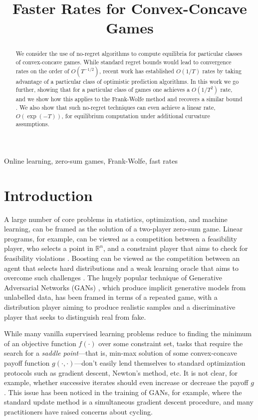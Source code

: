 \documentclass[pmlr]{jmlr} %
\title[Faster Rates for Convex-Concave Games]{Faster Rates for Convex-Concave Games}
\def\reals{\mathbb{R}}
\def\reals{\mathbb{R}}
\begin{document}
\maketitle
\begin{abstract}
We consider the use of no-regret algorithms to compute equilibria for particular classes of convex-concave games. While standard regret bounds would lead to convergence rates on the order of $O(T^{-1/2})$, recent work \citep{RS13,SALS15} has established $O(1/T)$ rates by taking advantage of a particular class of optimistic prediction algorithms. In this work we go further, showing that for a particular class of games one achieves a $O(1/T^{2})$ rate, and we show how this applies to the Frank-Wolfe method and recovers a similar bound \citep{D15}. We also show that such no-regret techniques can even achieve a linear rate, $O(\exp(-T))$, for equilibrium computation under additional curvature assumptions.
\end{abstract}

\begin{keywords}
Online learning, zero-sum games, Frank-Wolfe, fast rates
\end{keywords}

\section{Introduction}

A large number of core problems in statistics, optimization, and machine learning, can be framed as the solution of a two-player zero-sum game. Linear programs, for example, can be viewed as a competition between a feasibility player, who selects a point in $\reals^{n}$, and a constraint player that aims to check for feasibility violations \citep{Adler2013}. Boosting \citep{freund1999adaptive} can be viewed as the competition between an agent that selects hard distributions and a weak learning oracle that aims to overcome such challenges \citep{freund1996game}. The hugely popular technique of Generative Adversarial Networks (GANs) \citep{goodfellow2014generative}, which produce implicit generative models from unlabelled data, has been framed in terms of a repeated game, with a distribution player aiming to produce realistic samples and a discriminative player that seeks to distinguish real from fake. 

While many vanilla supervised learning problems reduce to finding the minimum of an objective function $f(\cdot)$ over some constraint set, tasks that require the search for a \emph{saddle point}---that is, min-max solution of some convex-concave payoff function $g(\cdot,\cdot)$---don't easily lend themselves to standard optimization protocols such as gradient descent, Newton's method, etc. It is not clear, for example, whether successive iterates should even increase or decrease the payoff $g$. This issue has been noticed in the training of GANs, for example, where the standard update method is a simultaneous gradient descent procedure, and many practitioners have raised concerns about cycling.
\end{document}
